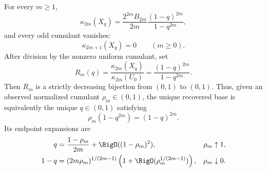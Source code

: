 \begin{theorem}
\label{thm:fr-cumulant-recovery}
For every \(m\ge1\),
\begin{equation}
 \kappa_{2m}(X_q)
 =\frac{2^{2m}B_{2m}}{2m}
   \frac{(1-q)^{2m}}{1-q^{2m}},
 \label{eq:fr-cumulants}
\end{equation}
and every odd cumulant vanishes:
\begin{equation}
 \kappa_{2m+1}(X_q)=0\qquad(m\ge0).
 \label{eq:fr-odd-cumulants}
\end{equation}
After division by the nonzero uniform cumulant, set
\[
 R_m(q)=\frac{\kappa_{2m}(X_q)}{\kappa_{2m}(U_0)}
 =\frac{(1-q)^{2m}}{1-q^{2m}}.
\]
Then \(R_m\) is a strictly decreasing bijection from \((0,1)\) to \((0,1)\).
Thus, given an observed normalized cumulant \(\rho_m\in(0,1)\), the unique
recovered base is equivalently the unique \(q\in(0,1)\) satisfying
\begin{equation}
 \rho_m(1-q^{2m})=(1-q)^{2m}.
 \label{eq:fr-cumulant-polynomial}
\end{equation}
Its endpoint expansions are
\begin{align}
 q&=\frac{1-\rho_m}{2m}+\BigO((1-\rho_m)^2),
 &&\rho_m\uparrow1,\label{eq:fr-cumulant-qzero}\\
 1-q&=(2m\rho_m)^{1/(2m-1)}
 \left(1+\BigO(\rho_m^{1/(2m-1)})\right),
 &&\rho_m\downarrow0.\label{eq:fr-cumulant-qone}
\end{align}
\end{theorem}

